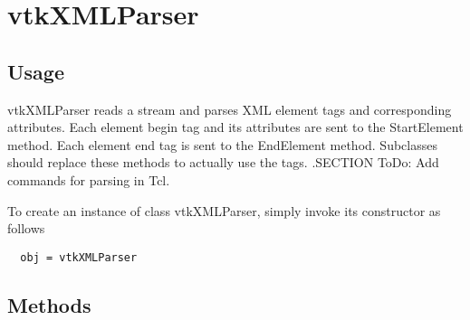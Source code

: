 \section{vtkXMLParser}

\subsection{Usage}

 vtkXMLParser reads a stream and parses XML element tags and corresponding
 attributes.  Each element begin tag and its attributes are sent to
 the StartElement method.  Each element end tag is sent to the
 EndElement method.  Subclasses should replace these methods to actually
 use the tags.
 .SECTION ToDo: Add commands for parsing in Tcl.

To create an instance of class vtkXMLParser, simply
invoke its constructor as follows
\begin{verbatim}
  obj = vtkXMLParser
\end{verbatim}
\subsection{Methods}

